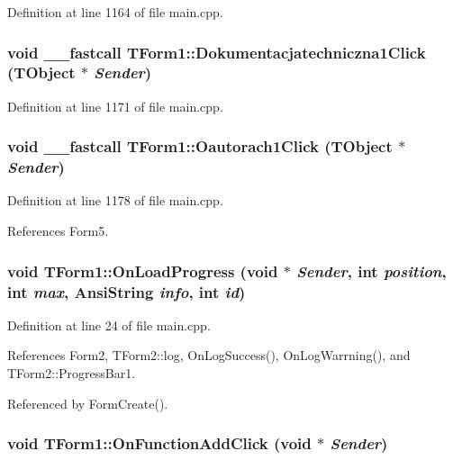 Definition at line 1164 of file main.cpp.\hypertarget{classTForm1_8e6db4f096e5cf3cfc4db6f436d28831}{
\subsubsection[Dokumentacjatechniczna1Click]{\setlength{\rightskip}{0pt plus 5cm}void \_\-\_\-fastcall TForm1::Dokumentacjatechniczna1Click (TObject $\ast$ {\em Sender})}}
\label{classTForm1_8e6db4f096e5cf3cfc4db6f436d28831}




Definition at line 1171 of file main.cpp.\hypertarget{classTForm1_d6cdb94fa817f5076531e3bf29e4d9ab}{
\subsubsection[Oautorach1Click]{\setlength{\rightskip}{0pt plus 5cm}void \_\-\_\-fastcall TForm1::Oautorach1Click (TObject $\ast$ {\em Sender})}}
\label{classTForm1_d6cdb94fa817f5076531e3bf29e4d9ab}




Definition at line 1178 of file main.cpp.

References Form5.\hypertarget{classTForm1_4e07d96a5ae579b4ee90fa1b7744e7a2}{
\subsubsection[OnLoadProgress]{\setlength{\rightskip}{0pt plus 5cm}void TForm1::OnLoadProgress (void $\ast$ {\em Sender}, \/  int {\em position}, \/  int {\em max}, \/  AnsiString {\em info}, \/  int {\em id})}}
\label{classTForm1_4e07d96a5ae579b4ee90fa1b7744e7a2}




Definition at line 24 of file main.cpp.

References Form2, TForm2::log, OnLogSuccess(), OnLogWarrning(), and TForm2::ProgressBar1.

Referenced by FormCreate().\hypertarget{classTForm1_9daceac11a528e49d52a5131e12aebe5}{
\subsubsection[OnFunctionAddClick]{\setlength{\rightskip}{0pt plus 5cm}void TForm1::OnFunctionAddClick (void $\ast$ {\em Sender})}}
\label{classTForm1_9daceac11a528e49d52a5131e12aebe5}




